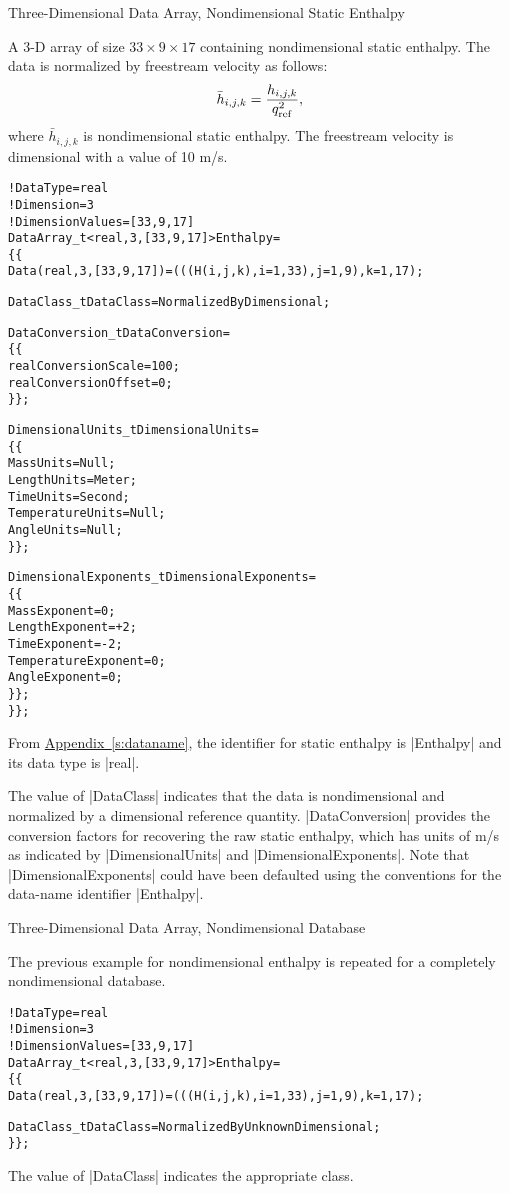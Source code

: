 \begin{example}{Three-Dimensional Data Array, Nondimensional Static Enthalpy}
\label{ex:data3}

A 3-D array of size $33\times 9\times 17$ containing nondimensional static 
enthalpy.  The data is normalized by freestream velocity as follows:
$$
 \bar{h}_{i,j,k} = {h_{i,j,k} \over q^2_{\rm ref}},
$$
where $\bar{h}_{i,j,k}$ is nondimensional static enthalpy.  The freestream
velocity is dimensional with a value of 10 m/s.  
\begin{alltt}
  !  DataType = real
  !  Dimension = 3
  !  DimensionValues = [33,9,17]
  DataArray\_t<real, 3, [33,9,17]> Enthalpy =
    \{\{
    Data(real, 3, [33,9,17]) = (((H(i,j,k), i=1,33), j=1,9), k=1,17) ;
    
    DataClass\_t DataClass = NormalizedByDimensional ;
    
    DataConversion\_t DataConversion =
      \{\{
      real ConversionScale  = 100 ;
      real ConversionOffset = 0 ;
      \}\} ;
      
    DimensionalUnits\_t DimensionalUnits =
      \{\{
      MassUnits        = Null ;
      LengthUnits      = Meter ;
      TimeUnits        = Second ;
      TemperatureUnits = Null ;
      AngleUnits       = Null ;
      \}\} ;
	
    DimensionalExponents\_t DimensionalExponents =
      \{\{
      MassExponent        =  0 ;
      LengthExponent      = +2 ;
      TimeExponent        = -2 ;
      TemperatureExponent =  0 ;
      AngleExponent       =  0 ;
      \}\} ;
    \}\} ;
\end{alltt}
From \hyperref[s:dataname]{Appendix~\ref*{s:dataname}}, the identifier for
static enthalpy is |Enthalpy| and its data type is |real|.

The value of |DataClass| indicates that the data is nondimensional and
normalized by a dimensional reference quantity.  |DataConversion| provides
the conversion factors for recovering the raw static enthalpy, which has
units of m/s as indicated by |DimensionalUnits| and
|DimensionalExponents|.  Note that |DimensionalExponents| could have been
defaulted using the conventions for the data-name identifier |Enthalpy|.
\end{example}

\begin{example}{Three-Dimensional Data Array, Nondimensional Database}
\label{ex:data4}

The previous example for nondimensional enthalpy is repeated for a
completely nondimensional database.
\begin{alltt}
  !  DataType = real
  !  Dimension = 3
  !  DimensionValues = [33,9,17]
  DataArray\_t<real, 3, [33,9,17]> Enthalpy =
    \{\{
    Data(real, 3, [33,9,17]) = (((H(i,j,k), i=1,33), j=1,9), k=1,17) ;
    
    DataClass\_t DataClass = NormalizedByUnknownDimensional ;
    \}\} ;
\end{alltt}
The value of |DataClass| indicates the appropriate class.  
\end{example}

